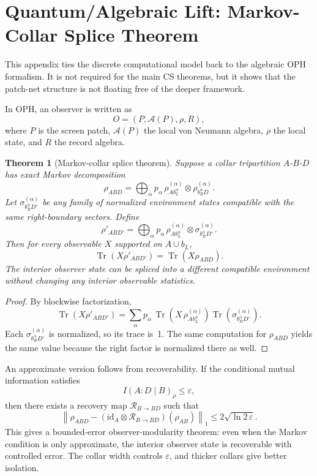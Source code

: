 \documentclass[11pt]{article}
\newtheorem{theorem}{Theorem}[section]
\begin{document}
\appendix
\section{Quantum/Algebraic Lift: Markov-Collar Splice Theorem}\label{app:splice}

This appendix ties the discrete computational model back to the algebraic OPH formalism. It is not required for the main CS theorems, but it shows that the patch-net structure is not floating free of the deeper framework.

In OPH, an observer is written as
\[
O=(P,\mathcal{A}(P),\rho,R),
\]
where $P$ is the screen patch, $\mathcal{A}(P)$ the local von Neumann algebra, $\rho$ the local state, and $R$ the record algebra.

\begin{theorem}[Markov-collar splice theorem]\label{thm:splice}
Suppose a collar tripartition $A$-$B$-$D$ has exact Markov decomposition
\[
\rho_{ABD}
=
\bigoplus_{\alpha}
p_\alpha\,
\rho^{(\alpha)}_{A b_L^\alpha}
\otimes
\rho^{(\alpha)}_{b_R^\alpha D}.
\]
Let $\sigma_{b_R^\alpha D'}^{(\alpha)}$ be any family of normalized environment states compatible with the same right-boundary sectors. Define
\[
\rho'_{AB D'}
=
\bigoplus_{\alpha}
p_\alpha\,
\rho^{(\alpha)}_{A b_L^\alpha}
\otimes
\sigma_{b_R^\alpha D'}^{(\alpha)}.
\]
Then for every observable $X$ supported on $A\cup b_L$,
\[
\operatorname{Tr}(X\rho'_{AB D'})
=
\operatorname{Tr}(X\rho_{ABD}).
\]
The interior observer state can be spliced into a different compatible environment without changing any interior observable statistics.
\end{theorem}

\begin{proof}
By blockwise factorization,
\[
\operatorname{Tr}(X\rho'_{AB D'})
=
\sum_\alpha
p_\alpha\,
\operatorname{Tr}\!\left(
X\, \rho^{(\alpha)}_{A b_L^\alpha}
\right)
\operatorname{Tr}\!\left(\sigma_{b_R^\alpha D'}^{(\alpha)}\right).
\]
Each $\sigma_{b_R^\alpha D'}^{(\alpha)}$ is normalized, so its trace is~1. The same computation for $\rho_{ABD}$ yields the same value because the right factor is normalized there as well.
\end{proof}

An approximate version follows from recoverability. If the conditional mutual information satisfies
\[
I(A:D\mid B)_\rho \le \varepsilon,
\]
then there exists a recovery map $\mathcal{R}_{B\to BD}$ such that
\[
\left\|
\rho_{ABD}
-
(\mathrm{id}_A\otimes\mathcal{R}_{B\to BD})(\rho_{AB})
\right\|_1
\le
2\sqrt{\ln 2\,\varepsilon}.
\]
This gives a bounded-error observer-modularity theorem: even when the Markov condition is only approximate, the interior observer state is recoverable with controlled error. The collar width controls $\varepsilon$, and thicker collars give better isolation.
\end{document}
